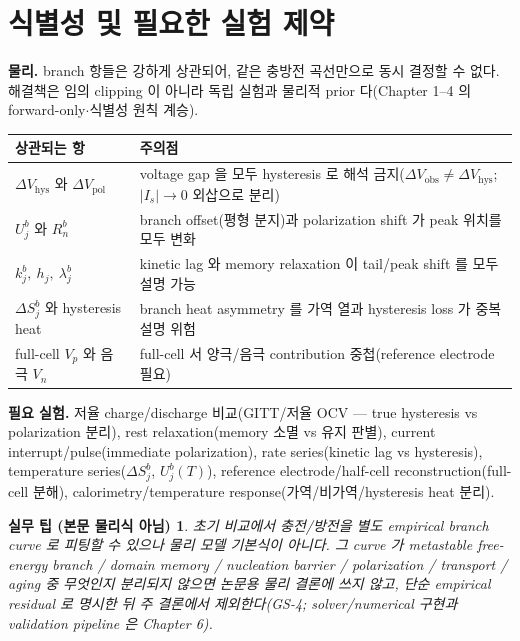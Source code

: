 \documentclass[11pt,a4paper]{article}
\newtheorem*{practicebox}{실무 팁 (본문 물리식 아님)}
\newcommand{\hys}{\mathrm{hys}}
\newcommand{\pol}{\mathrm{pol}}
\newcommand{\obs}{\mathrm{obs}}
\begin{document}
\section{식별성 및 필요한 실험 제약}\label{sec:ch5_ident}
\textbf{물리.} branch 항들은 강하게 상관되어, 같은 충방전 곡선만으로 동시 결정할 수 없다. 해결책은 임의
clipping 이 아니라 독립 실험과 물리적 prior 다(Chapter 1--4 의 forward-only$\cdot$식별성 원칙 계승).
\begin{longtable}{p{} >{\raggedright\arraybackslash}p{}}
\toprule 상관되는 항 & 주의점 \\ \midrule \endhead
$\Delta V_\hys$ 와 $\Delta V_\pol$ & voltage gap 을 모두 hysteresis 로 해석 금지($\Delta V_\obs\ne\Delta V_\hys$; $|I_s|\to0$ 외삽으로 분리) \\
$U_j^b$ 와 $R_n^b$ & branch offset(평형 분지)과 polarization shift 가 peak 위치를 모두 변화 \\
$k_j^b,\ h_j,\ \lambda_j^b$ & kinetic lag 와 memory relaxation 이 tail/peak shift 를 모두 설명 가능 \\
$\Delta S_j^b$ 와 hysteresis heat & branch heat asymmetry 를 가역 열과 hysteresis loss 가 중복 설명 위험 \\
full-cell $V_p$ 와 음극 $V_n$ & full-cell 서 양극/음극 contribution 중첩(reference electrode 필요) \\
\bottomrule
\end{longtable}
\textbf{필요 실험.} 저율 charge/discharge 비교(GITT/저율 OCV — true hysteresis vs polarization 분리), rest
relaxation(memory 소멸 vs 유지 판별), current interrupt/pulse(immediate polarization), rate series(kinetic
lag vs hysteresis), temperature series($\Delta S_j^b$, $U_j^b(T)$), reference electrode/half-cell
reconstruction(full-cell 분해), calorimetry/temperature response(가역/비가역/hysteresis heat 분리).
\begin{practicebox}
초기 비교에서 충전/방전을 별도 empirical branch curve 로 피팅할 수 있으나 \emph{물리 모델 기본식이 아니다}.
그 curve 가 metastable free-energy branch / domain memory / nucleation barrier / polarization / transport /
aging 중 무엇인지 분리되지 않으면 논문용 물리 결론에 쓰지 않고, 단순 empirical residual 로 명시한 뒤 주 결론에서
제외한다(GS-4; solver/numerical 구현과 validation pipeline 은 Chapter 6).
\end{practicebox}

\end{document}
